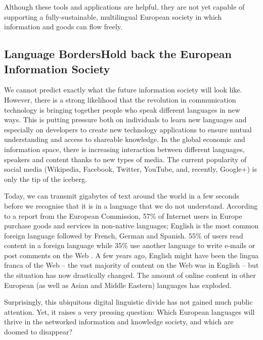\begin{multicols}{2}
Although these tools and applications are helpful, they are not yet capable of supporting a fully-sustainable, multilingual European society in which information and goods can flow freely.

\subsection[Language Borders Hold back the European Information Society]{Language Borders\newline Hold back the European Information Society}

We cannot predict exactly what the future information society will look like. However, there is a strong likelihood that the revolution in communication technology is bringing together people who speak different languages in new ways. This is putting pressure both on individuals to learn new languages and especially on developers to create new technology applications to ensure mutual understanding and access to shareable knowledge. In the global economic and information space, there is increasing interaction between different languages, speakers and content thanks to new types of media. The current popularity of social media (Wikipedia, Facebook, Twitter, YouTube, and, recently, Google+) is only the tip of the iceberg.


Today, we can transmit gigabytes of text around the world in a few seconds before we recognise that it is in a language that we do not understand. According to a report from the European Commission, 57\% of Internet users in Europe purchase goods and services in non-native languages; English is the most common foreign language followed by French, German and Spanish. 55\% of users read content in a foreign language while 35\% use another language to write e-mails or post comments on the Web \cite{EC1}. A few years ago, English might have been the lingua franca of the Web -- the vast majority of content on the Web was in English -- but the situation has now drastically changed. The amount of online content in other European (as well as Asian and Middle Eastern) languages has exploded.

Surprisingly, this ubiquitous digital linguistic divide has not gained much public attention. Yet, it raises a very pressing question: Which European languages will thrive in the networked information and knowledge society, and which are doomed to disappear?


\end{multicols}
